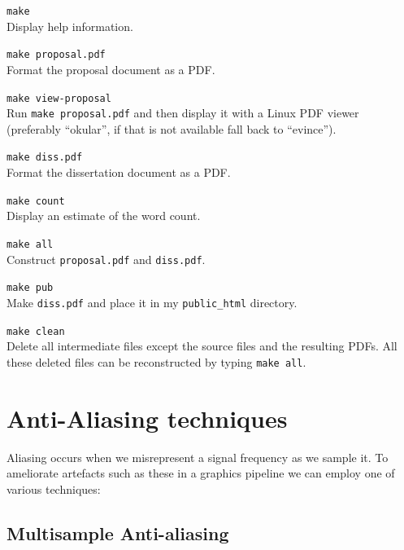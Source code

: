 \documentclass[12pt,a4paper,twoside,openright]{report}
\begin{document}
\begin{description}

\item\texttt{make} \\
 Display help information.

\item\texttt{make proposal.pdf} \\
 Format the proposal document as a PDF.

\item\texttt{make view-proposal} \\
 Run \texttt{make proposal.pdf} and then display it with a Linux PDF viewer
 (preferably ``okular'', if that is not available fall back to ``evince'').

\item\texttt{make diss.pdf} \\
 Format the dissertation document as a PDF.

\item\texttt{make count} \\
Display an estimate of the word count.

\item\texttt{make all} \\
Construct \texttt{proposal.pdf} and \texttt{diss.pdf}.

\item\texttt{make pub} \\ Make \texttt{diss.pdf}
and place it in my \texttt{public\_html} directory.

\item\texttt{make clean} \\ Delete all intermediate files except the
source files and the resulting PDFs. All these deleted files can
be reconstructed by typing \texttt{make all}.

\end{description}


\section{Anti-Aliasing techniques}

Aliasing occurs when we misrepresent a signal frequency as we sample it. 
To ameliorate artefacts such as these in a graphics pipeline we can employ one of various techniques:

\subsection{Multisample Anti-aliasing}
\end{document}

